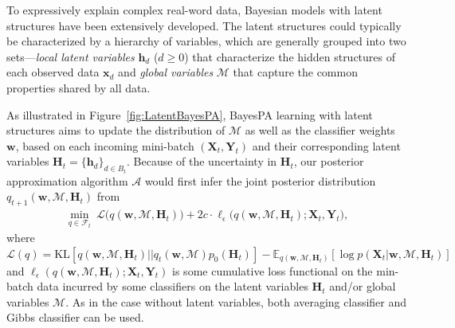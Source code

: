 \documentclass[twoside,11pt]{article}
\newcommand{\xv}{\bm{x}}
\newcommand{\Xv}{\bm{X}}
\newcommand{\Yv}{\bm{Y}}
\newcommand{\hv}{\bm{h}}
\newcommand{\Hv}{\bm{H}}
\newcommand{\algo}{\mathcal{A}}
\newcommand{\wv}{\bm{w}}
\newcommand{\Mv}{\bm{\mathcal{M}}}
\begin{document}
To expressively explain complex real-word data, Bayesian models with latent structures have been extensively developed. The latent structures could typically be characterized by a hierarchy of  variables, which are generally grouped into two sets---\emph{local latent variables} $\hv_d$ ($d \geq 0$) that characterize the hidden structures of each observed data $\xv_d$ and \emph{global variables} $\Mv$ that capture the common properties shared by all data.

As illustrated in Figure~\ref{fig:LatentBayesPA}, BayesPA learning with latent structures aims to update the distribution of $\Mv$ as well as the classifier weights $\wv$, based on each incoming mini-batch $(\Xv_t, \Yv_t)$ and their corresponding latent variables $\Hv_t = \{\hv_d\}_{d \in B_t}$. Because of the uncertainty in $\Hv_t$, our posterior approximation algorithm $\algo$ would first infer the joint posterior distribution $q_{t+1}(\wv, \Mv, \Hv_t)$ from
\begin{eqnarray}\label{eq:bayespa_latent}
\underset{q \in \mathcal{F}_t}{\operatorname{min}}{~\mathcal{L}\Big( q(\wv, \Mv, \Hv_t) \Big) + 2 c \cdot \ell_\epsilon\Big( q(\wv, \Mv, \Hv_t); \Xv_t, \Yv_t \Big)},
\end{eqnarray}
where $\mathcal{L}(q) =  \text{KL}[q(\wv, \Mv, \Hv_t) ||  q_t(\wv, \Mv) p_0(\Hv_t)] -\mathbb{E}_{q(\wv, \Mv, \Hv_t)}[\log p(\Xv_t | \wv,  \Mv, \Hv_t)]$ and $\ell_\epsilon(q(\wv, \Mv, \Hv_t); \Xv_t, \Yv_t)$ is some cumulative loss functional on the min-batch data incurred by some classifiers on the latent variables $\Hv_t$ and/or global variables $\Mv$. As in the case without latent variables, both averaging classifier and Gibbs classifier can be used.


%
%
\end{document}
